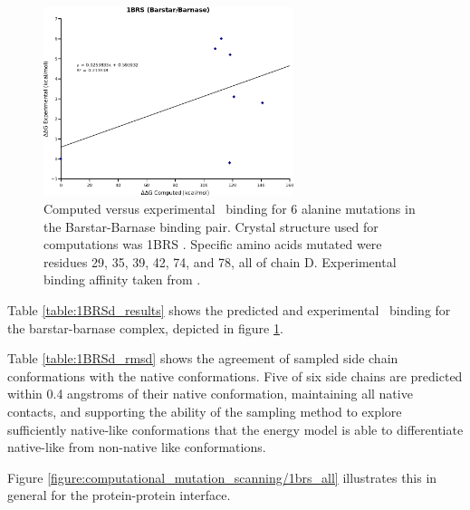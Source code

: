 \begin{figure}[h]
    \centering
    \includegraphics[width=0.65\textwidth]{figures/1brs_barstar_barnase.png}
    \caption{Computed versus experimental \ddg\ binding for 6 alanine mutations in the Barstar-Barnase binding pair.
    Crystal structure used for computations was 1BRS \protect\cite{buckle1994protein}.
    Specific amino acids mutated were residues 29, 35, 39, 42, 74, and 78, all of chain D.
    Experimental binding affinity taken from \protect\cite{thorn2001asedb}.}
    \label{figure:computational_mutation_scanning/1BRSd_ddg}
\end{figure}

Table \ref{table:1BRSd_results} shows the predicted and experimental \ddg\ binding for the barstar-barnase complex, depicted in figure \ref{figure:computational_mutation_scanning/1BRSd_ddg}.

Table \ref{table:1BRSd_rmsd} shows the agreement of sampled side chain conformations with the native conformations.
Five of six side chains are predicted within 0.4 angstroms of their native conformation, maintaining all native contacts, and supporting the ability of the sampling method to explore sufficiently native-like conformations that the energy model is able to differentiate native-like from non-native like conformations.

Figure \ref{figure:computational_mutation_scanning/1brs_all}  illustrates this in general for the protein-protein interface.

